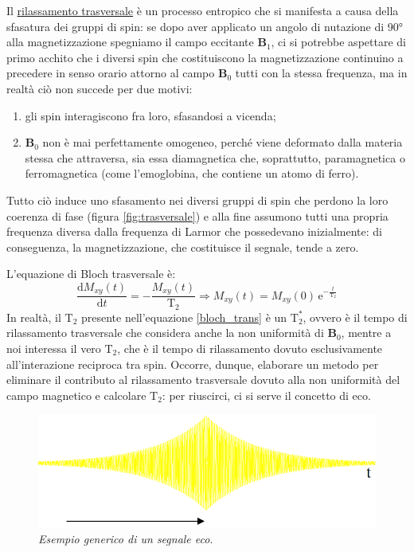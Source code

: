 \documentclass{report}
\newcommand{\figref}[1]{figura \ref{#1}}
\numberwithin{equation}{section}
\numberwithin{figure}{section}
\renewcommand{\Vec}{\bm}
\begin{document}
Il \underline{rilassamento trasversale} è un processo entropico che si manifesta a causa della sfasatura dei gruppi di spin: se dopo aver applicato un angolo di nutazione di 90° alla magnetizzazione spegniamo il campo eccitante $\Vec{B}_1$, ci si potrebbe aspettare di primo acchito che i diversi spin che costituiscono la magnetizzazione continuino a precedere in senso orario attorno al campo $\Vec{B}_0$ tutti con la stessa frequenza, ma in realtà ciò non succede per due motivi:
\begin{enumerate}
    \item gli spin interagiscono fra loro, sfasandosi a vicenda;
    \item $\Vec{B}_0$ non è mai perfettamente omogeneo, perché viene deformato dalla materia stessa che attraversa, sia essa diamagnetica che, soprattutto, paramagnetica o ferromagnetica (come l'emoglobina, che contiene un atomo di ferro).
\end{enumerate}
Tutto ciò induce uno sfasamento nei diversi gruppi di spin che perdono la loro coerenza di fase (\figref{fig:trasversale}) e alla fine assumono tutti una propria frequenza diversa dalla frequenza di Larmor che possedevano inizialmente: di conseguenza, la magnetizzazione, che costituisce il segnale, tende a zero.

\noindent L'equazione di Bloch trasversale è:
\begin{equation}\label{bloch_trans}
    \frac{\mathrm{d}M_{xy}(t)}{\mathrm{d}t}=-\frac{M_{xy}(t)}{\mathrm{T_2}} \Rightarrow \boxed{M_{xy}(t)=M_{xy}(0)\,\mathrm{e}^{-\frac{t}{\mathrm{T_2}}}}
\end{equation}
In realtà, il $\mathrm{T_2}$ presente nell'equazione \ref{bloch_trans} è un $\mathrm{T_2^*}$, ovvero è il tempo di rilassamento trasversale che considera anche la non uniformità di $\Vec{B}_0$, mentre a noi interessa il vero $\mathrm{T_2}$, che è il tempo di rilassamento dovuto esclusivamente all'interazione reciproca tra spin. Occorre, dunque, elaborare un metodo per eliminare il contributo al rilassamento trasversale dovuto alla non uniformità del campo magnetico e calcolare $\mathrm{T_2}$: per riuscirci, ci si serve il concetto di eco.

\begin{figure}[htp]
    \centering
    \includegraphics[scale=0.5]{immagini/eco.png}
    \caption{\textit{Esempio generico di un segnale eco}.}
    \label{fig:eco}
\end{figure}
\end{document}
